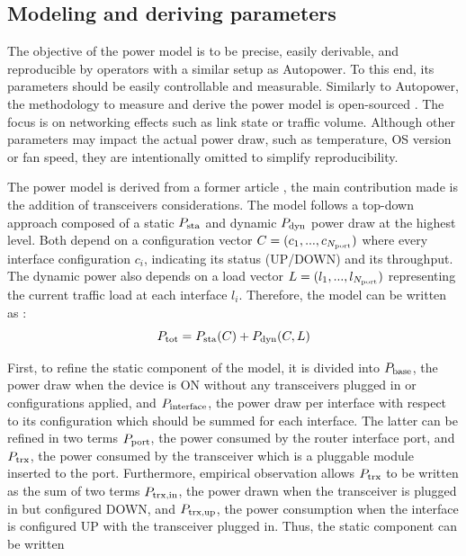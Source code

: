\subsection{Modeling and deriving parameters}\label{sec:model} 
The objective of the power model is to be precise, easily derivable, and reproducible by operators with a similar setup as Autopower.
To this end, its parameters should be easily controllable and measurable.
Similarly to Autopower, the methodology to measure and derive the power model is open-sourced \cite{NetPowerBench}. 
The focus is on networking effects such as link state or traffic volume.
Although other parameters may impact the actual power draw, such as temperature, OS version or fan speed, they are intentionally omitted to simplify reproducibility.

The power model is derived from a former article \cite{35}, the main contribution made is the addition of transceivers considerations. 
The model follows a top-down approach composed of a static $P_{\textnormal{sta}}$ and dynamic $P_{\textnormal{dyn}}$ power draw at the highest level.  
Both depend on a configuration vector $C = (c_1, ..., c_{N_{\textnormal{port}}})$ where every interface configuration $c_i$, indicating its status (UP/DOWN) and its throughput. 
The dynamic power also depends on a load vector $L = (l_1, ..., l_{N_{\textnormal{port}}})$ representing the current traffic load at each interface $l_i$.
Therefore, the model can be written as : 
\begin{equation}
	P_{\textnormal{tot}} = P_{\textnormal{sta}}(C) + P_{\textnormal{dyn}}(C,L)
\end{equation}

First, to refine the static component of the model, it is divided into $P_{\textnormal{base}}$, the power draw when the device is ON without any transceivers plugged in or configurations applied, and $P_{\textnormal{interface}}$, the power draw per interface with respect to its configuration which should be summed for each interface. 
The latter can be refined in two terms $P_{\textnormal{port}}$, the power consumed by the router interface port, and $P_{\textnormal{trx}}$, the power consumed by the transceiver which is a pluggable module inserted to the port. 
Furthermore, empirical observation allows  $P_{\textnormal{trx}}$ to be written as the sum of two terms $P_{\textnormal{trx,in}}$, the power drawn when the transceiver is plugged in but configured DOWN, and $P_{\textnormal{trx,up}}$, the power consumption when the interface is configured UP with the transceiver plugged in.
Thus, the static component can be written


